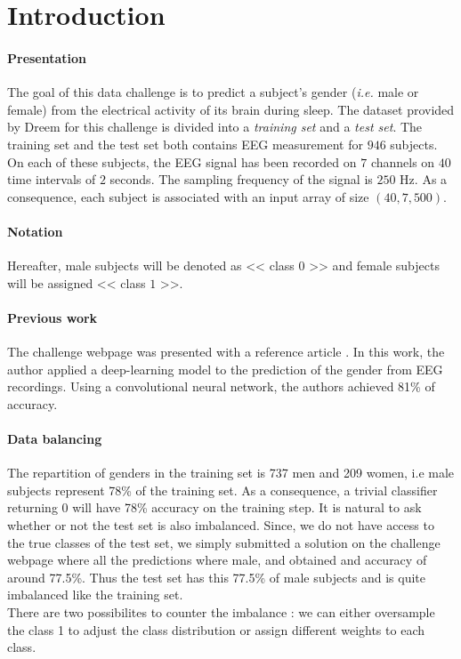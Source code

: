 \section{Introduction}

\paragraph{Presentation}The goal of this data challenge is to predict a subject's gender (\emph{i.e.} male or female) from the electrical activity of its brain during sleep.
The dataset provided by Dreem for this challenge is divided into a \textit{training set} and a \textit{test set}. The training set and the test set both contains EEG measurement for $946$ subjects. On each of these subjects, the EEG signal has been recorded on $7$ channels on $40$ time intervals of $2$ seconds. The sampling frequency of the signal is $250$ Hz. As a consequence, each subject is associated with an input array of size $(40, 7, 500)$.
 
\paragraph{Notation} Hereafter, male subjects will be denoted as << class $0$ >> and female subjects will be assigned << class $1$ >>.

\paragraph{Previous work}

The challenge webpage was presented with a reference article \cite{nature_original}. In this work, the author applied a deep-learning model to the prediction of the gender from EEG recordings. Using a convolutional neural network, the authors achieved 81\% of accuracy. 

\paragraph{Data balancing} The repartition of genders in the training set is 737 men and 209 women, i.e male subjects represent 78\% of the training set. As a consequence, a trivial classifier returning 0 will have 78\% accuracy on the training step. It is natural to ask whether or not the test set is also imbalanced. Since, we do not have access to the true classes of the test set, we simply submitted a solution on the challenge webpage where all the predictions where male, and obtained and accuracy of around 77.5\%. Thus the test set has this 77.5\% of male subjects and is quite imbalanced like the training set. \\
There are two possibilites to counter the imbalance : we can either oversample the class 1 to adjust the class distribution or assign different weights to each class.